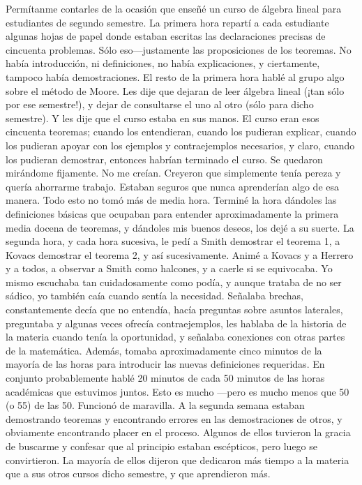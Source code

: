 \documentclass[12pt]{article}
\begin{document}
    Permítanme contarles de la ocasión que enseñé un curso de álgebra lineal para estudiantes de segundo semestre.
    La primera hora repartí a cada estudiante algunas hojas de papel donde estaban escritas las declaraciones precisas
    de cincuenta problemas.
    Sólo eso—justamente las proposiciones de los teoremas.
    No había introducción, ni definiciones, no había explicaciones, y ciertamente, tampoco había demostraciones.
    El resto de la primera hora hablé al grupo algo sobre el método de Moore.
    Les dije que dejaran de leer álgebra lineal (¡tan sólo por ese semestre!), y dejar de consultarse el uno al otro
    (sólo para dicho semestre).
    Y les dije que el curso estaba en sus manos.
    El curso eran esos cincuenta teoremas; cuando los entendieran, cuando los pudieran explicar, cuando los pudieran
    apoyar con los ejemplos y contraejemplos necesarios, y claro, cuando los pudieran demostrar, entonces habrían terminado el curso.
    Se quedaron mirándome fijamente.
    No me creían.
    Creyeron que simplemente tenía pereza y quería ahorrarme trabajo.
    Estaban seguros que nunca aprenderían algo de esa manera.
    Todo esto no tomó más de media hora.
    Terminé la hora dándoles las definiciones básicas que ocupaban para entender aproximadamente la primera media
    docena de teoremas, y dándoles mis buenos deseos, los dejé a su suerte.
    La segunda hora, y cada hora sucesiva, le pedí a Smith
    demostrar el teorema 1, a Kovacs demostrar el teorema 2, y así sucesivamente.
    Animé a Kovacs y a Herrero y
    a todos, a observar a Smith como halcones, y a caerle si se equivocaba.
    Yo mismo escuchaba tan
    cuidadosamente como podía, y aunque trataba de no ser sádico, yo también caía cuando sentía la necesidad.
    Señalaba brechas, constantemente decía que no entendía, hacía preguntas sobre asuntos laterales, preguntaba
    y algunas veces ofrecía contraejemplos, les hablaba de la historia de la materia cuando tenía la oportunidad, y
    señalaba conexiones con otras partes de la matemática.
    Además, tomaba aproximadamente cinco minutos de
    la mayoría de las horas para introducir las nuevas definiciones requeridas.
    En conjunto probablemente hablé
    20 minutos de cada 50 minutos de las horas académicas que estuvimos juntos.
    Esto es mucho —pero es
    mucho menos que 50 (o 55) de las 50.
    Funcionó de maravilla.
    A la segunda semana estaban demostrando
    teoremas y encontrando errores en las demostraciones de otros, y obviamente encontrando placer en el
    proceso.
    Algunos de ellos tuvieron la gracia de buscarme y confesar que al principio estaban escépticos, pero luego se convirtieron.
    La mayoría de ellos dijeron que dedicaron más tiempo a la materia que a sus otros
    cursos dicho semestre, y que aprendieron más.
\end{document}
